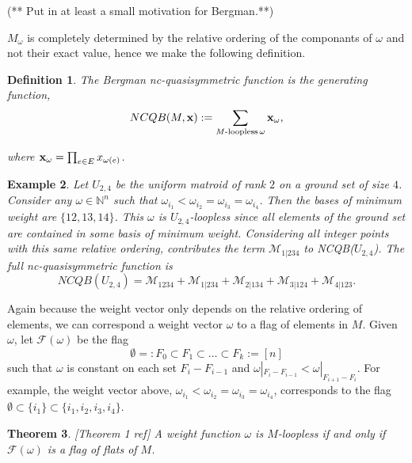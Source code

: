 \documentclass[12pt,reqno]{amsart}
\newtheorem{definition}{Definition}
\numberwithin{definition}{section}
\newtheorem{theorem}[definition]{Theorem}
\newtheorem{example}[definition]{Example}
\newcommand{\om}{\omega}
\newcommand{\ncM}{\mathcal{M}}
\begin{document}
 (** Put in at least a small motivation for Bergman.**)

$M_{\omega}$ is completely determined by the
relative ordering of the componants of $\omega$ and not their exact
value, hence we make the following definition.


\begin{definition}
The Bergman nc-quasisymmetric function is the generating function,
$$NCQB(M,{\bf x}) := \sum_{M\textrm{-loopless} \, \omega} {\bf x}_{\omega},$$

where ${\bf x}_{\omega} = \prod_{e \in E} x_{\omega(e)}$.
\end{definition}


\begin{example}

Let $U_{2,4}$ be the uniform matroid of rank $2$ on a ground set of
size $4$.  Consider any $\omega \in \mathbb{N}^n$ such that
$\omega_{i_1} < \omega_{i_2} = \omega_{i_3} = \omega_{i_4}$.  Then the
bases of minimum weight are $\{12, 13, 14\}$.  This $\omega$ is
$U_{2,4}$-loopless since all elements of the ground set are contained
in some basis of minimum weight.  Considering all integer points with this same relative ordering,  contributes the term
${\ncM}_{1|234}$ to NCQB($U_{2,4}$).  The full nc-quasisymmetric function
is
$$NCQB(U_{2,4})  = {\ncM}_{1234} + {\ncM}_{1|234} + {\ncM}_{2|134} + {\ncM}_{3|124} + {\ncM}_{4|123}. $$

\end{example}


Again because the weight vector only depends on the relative ordering
of elements, we can correspond a weight vector $\om$ to a flag of
elements in $M$.  Given $\om$, let $\mathcal{F}(\om)$ be the flag
$$\emptyset =: F_0 \subset F_1 \subset \ldots \subset F_k := [n]$$
such that $\om$ is constant on each set $F_i - F_{i-1}$ and $\om|_{F_i -
  F_{i-1}} < \om|_{F_{i+1} - F_{i}} $.  For example, the weight vector
above, $\om_{i_1} < \om_{i_2} = \om_{i_3} = \om_{i_4}$, corresponds to
the flag ${\emptyset \subset \{i_1\} \subset \{i_1,i_2,i_3,i_4\}}$.

\begin{theorem}\label{thm:Bergman}[Theorem 1 ref]
A weight function $\omega$ is $M$-loopless if and only if $\mathcal{F}(\om)$ is a flag of flats of $M$.
\end{theorem}
\end{document}

